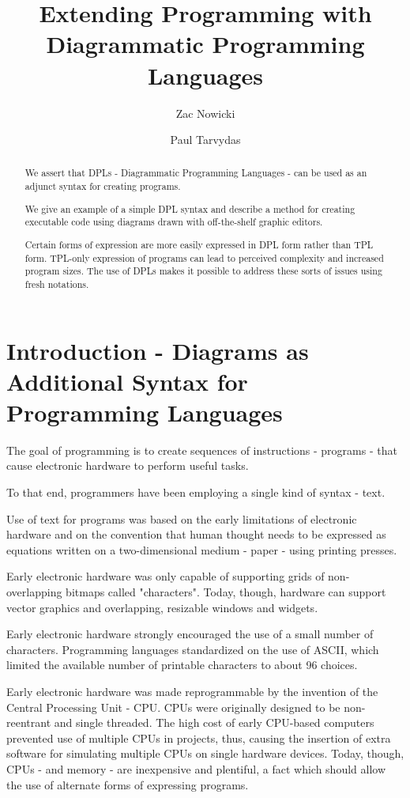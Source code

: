 \documentclass[10pt]{acmart}
\title{Extending Programming with Diagrammatic Programming Languages}
\author{Zac Nowicki}
\affiliation{
  \institution{Kagi Inc.}
  \city{Palo Alto}
  \state{CA}
  \country{USA}
}
\author{Paul Tarvydas}
\affiliation{
  \institution{Retired}
  \city{Toronto}
  \state{Ontario}
  \country{Canada}
}
\begin{document}
\begin{abstract}

We assert that DPLs - Diagrammatic Programming Languages - can be used as an adjunct syntax for creating programs.

We give an example of a simple DPL syntax and describe a method for creating executable code using diagrams drawn with off-the-shelf graphic editors.
  
Certain forms of expression are more easily expressed in DPL form rather than TPL form. TPL-only expression of programs can lead to perceived complexity and increased program sizes. The use of DPLs makes it possible to address these sorts of issues using fresh notations.
\end{abstract}

\maketitle

\section{Introduction - Diagrams as Additional Syntax for Programming Languages}
The goal of programming is to create sequences of instructions -
programs - that cause electronic hardware to perform useful tasks.

To that end, programmers have been employing a single kind of syntax -
text.

Use of text for programs was based on the early limitations of
electronic hardware and on the convention that human thought needs to be
expressed as equations written on a two-dimensional medium - paper -
using printing presses.

Early electronic hardware was only capable of supporting grids of
non-overlapping bitmaps called "characters". Today, though, hardware can
support vector graphics and overlapping, resizable windows and widgets.

Early electronic hardware strongly encouraged the use of a small number of characters. Programming languages standardized on the use of ASCII, which limited the available number of printable characters to about 96 choices.

Early electronic hardware was made reprogrammable by the invention of
the Central Processing Unit - CPU. CPUs were originally designed to be
non-reentrant and single threaded. The high cost of early CPU-based
computers prevented use of multiple CPUs in projects, thus, causing the
insertion of extra software for simulating multiple CPUs on single
hardware devices. Today, though, CPUs - and memory - are inexpensive and
plentiful, a fact which should allow the use of alternate forms of
expressing programs.
\end{document}
